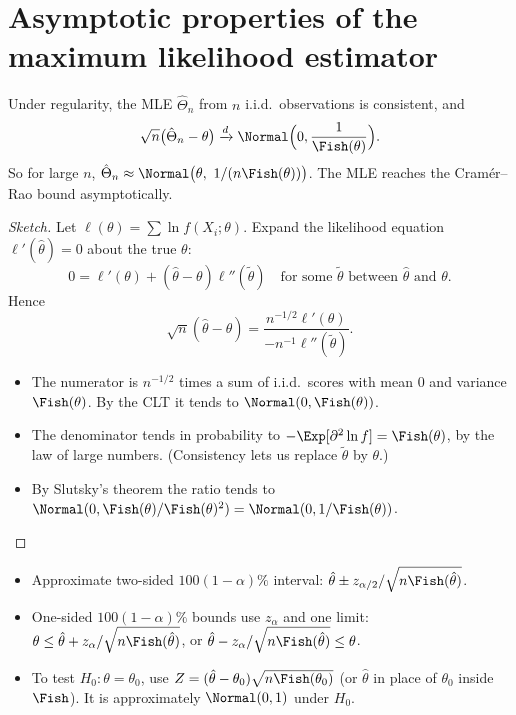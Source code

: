\section{Asymptotic properties of the maximum likelihood estimator}

\begin{theorem}\label{thm:mle-asym}
Under regularity, the MLE $\hat\Theta_n$ from $n$ i.i.d.\ observations is consistent, and
\[ \sqrt n\big(\hat\Theta_n-\theta\big)\xrightarrow{d}\Normal\Big(0,\frac1{\Fish(\theta)}\Big). \]
So for large $n$, $\hat\Theta_n\approx\Normal\big(\theta,\ 1/(n\Fish(\theta))\big)$. The MLE reaches the Cram\'er--Rao bound asymptotically.
\end{theorem}

\begin{proof}[Sketch]
Let $\ell(\theta)=\sum\ln f(X_i;\theta)$. Expand the likelihood equation $\ell'(\hat\theta)=0$ about the true $\theta$:
\[ 0=\ell'(\theta)+(\hat\theta-\theta)\ell''(\tilde\theta)\quad\text{for some }\tilde\theta\text{ between }\hat\theta\text{ and }\theta. \]
Hence
\[ \sqrt n(\hat\theta-\theta)=\frac{n^{-1/2}\ell'(\theta)}{-n^{-1}\ell''(\tilde\theta)}. \]
\begin{itemize}
  \item The numerator is $n^{-1/2}$ times a sum of i.i.d.\ scores with mean $0$ and variance $\Fish(\theta)$. By the CLT it tends to $\Normal(0,\Fish(\theta))$.
  \item The denominator tends in probability to $-\Exp[\partial^2\ln f]=\Fish(\theta)$, by the law of large numbers. (Consistency lets us replace $\tilde\theta$ by $\theta$.)
  \item By Slutsky's theorem the ratio tends to $\Normal(0,\Fish(\theta)/\Fish(\theta)^2)=\Normal(0,1/\Fish(\theta))$.
\end{itemize}
\end{proof}

\begin{corollary}\label{cor:wald}
\begin{itemize}
  \item Approximate two-sided $100(1-\alpha)\%$ interval: $\hat\theta\pm z_{\alpha/2}/\sqrt{n\Fish(\hat\theta)}$.
  \item One-sided $100(1-\alpha)\%$ bounds use $z_\alpha$ and one limit: $\theta\le\hat\theta+z_\alpha/\sqrt{n\Fish(\hat\theta)}$, or $\hat\theta-z_\alpha/\sqrt{n\Fish(\hat\theta)}\le\theta$.
  \item To test $H_0:\theta=\theta_0$, use $Z=(\hat\theta-\theta_0)\sqrt{n\Fish(\theta_0)}$ (or $\hat\theta$ in place of $\theta_0$ inside $\Fish$). It is approximately $\Normal(0,1)$ under $H_0$.
\end{itemize}
\end{corollary}

